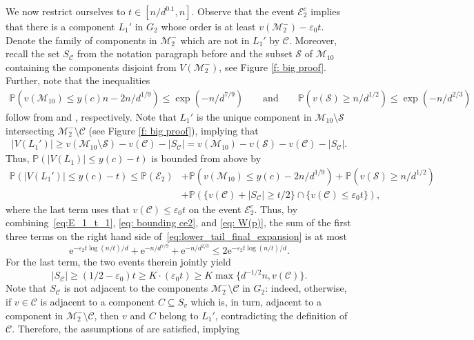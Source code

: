 \documentclass[reqno,final,a4paper]{amsart}
\theoremstyle{definition}
\newcommand{\cC}{\mathcal{C}}
\newcommand{\cE}{\mathcal{E}}
\newcommand{\cM}{\mathcal{M}}
\newcommand{\cS}{\mathcal{S}}
\def\e{\mathrm{e}}
\def\eps{\varepsilon}
\newcommand{\1}{\mathbbm{1}}
\begin{document}
We now restrict ourselves to $t\in [n/d^{0.1},n]$. Observe that the event $\cE_2^c$ implies that there is a component $L_1'$ in $G_2$ whose order is at least $v(\cM_2^-)-\eps_0t$. 
Denote the family of components in $\cM_2^-$ which are not in $L_1'$ by $\cC$. 
Moreover, recall the set $S_{\cC}$ from the notation paragraph before  and the subset $\cS$ of $\cM_{10}$ containing the components disjoint from $V(\cM_2^-)$, see Figure \ref{f: big proof}. Further, note that the inequalities
\begin{align}
    \mathbb{P}(v(\cM_{10})\le y(c)n-2n/d^{1/9})\le \exp(-n/d^{7/9})\qquad \text{and}\qquad \mathbb{P}(v(\cS)\ge n/d^{1/2})\le \exp(-n/d^{2/3})\label{eq: W(p)}
\end{align}
follow from  and , respectively. 
Note that $L_1'$ is the unique component in $\cM_{10}\setminus \cS$ intersecting $\cM_2^-\setminus \cC$ (see Figure \ref{f: big proof}), implying that
\begin{align*}
|V(L_1')|\ge v(\cM_{10}\setminus\cS)-v(\cC)-|S_{\cC}| = v(\cM_{10})-v(\cS)-v(\cC)-|S_{\cC}|.
\end{align*}
Thus, $\mathbb{P}\left(|V(L_1)|\le y(c)-t\right)$ is bounded from above by
\begin{equation}\label{eq:lower_tail_final_expansion}
\begin{split}
\mathbb{P}\left(|V(L_1')|\le y(c)-t\right)
\le \mathbb{P}(\cE_2)
&+ \mathbb{P}(v(\cM_{10})\le y(c)-2n/d^{1/9})
+\mathbb{P}(v(\cS)\ge n/d^{1/2})\\
&+\mathbb{P}(\{v(\cC)+|S_{\cC}|\ge t/2\}\cap \{v(\cC)\le \eps_0t\}),
\end{split}
\end{equation}
where the last term uses that $v(\cC)\le \eps_0 t$ on the event $\cE_2^c$.
Thus, by combining~\eqref{eq:E_1_t_1}, \eqref{eq: bounding ce2}, and \eqref{eq: W(p)}, the sum of the first three terms on the right hand side of~\eqref{eq:lower_tail_final_expansion} is at most 
\[
\e^{-\eps_2t\log(n/t)/d}+\e^{-n/d^{7/9}}+\e^{-n/d^{2/3}}\le 2\e^{-\eps_2t\log(n/t)/d}.
\]
For the last term, the two events therein jointly yield 
$$
|S_{\cC}|\ge (1/2-\eps_0)t\ge K\cdot (\eps_0t)\ge K\max\{d^{-1/2}n,v(\cC)\}.
$$
Note that $S_{\cC}$ is not adjacent to the components $\cM_2^-\setminus \cC$ in $G_2$: indeed, otherwise, if $v\in \cC$ is adjacent to a component $C\subseteq S_v$ which is, in turn, adjacent to a component in $\cM_2^-\setminus \cC$, then $v$ and $C$ belong to $L_1'$, contradicting the definition of $\cC$. Therefore, the assumptions of  are satisfied, implying 
\end{document}
